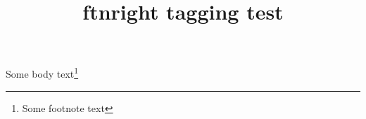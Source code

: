 \documentclass[twocolumn]{article}
\title{ftnright tagging test}
\begin{document}
Some body text\footnote{Some footnote text}
\end{document}
